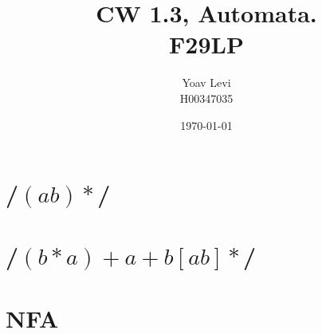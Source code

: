 \documentclass{article} %
\title{%
  CW 1.3, Automata. \\
  \large F29LP}
\author{%
Yoav Levi\\
\small H00347035
} %
\date{\today} %
\begin{document}
    \maketitle %
    
    \section{/$(ab)*$/} %
    \section{/$(b*a)+a+b[ab]*$/}
    \section{NFA}
\end{document}
